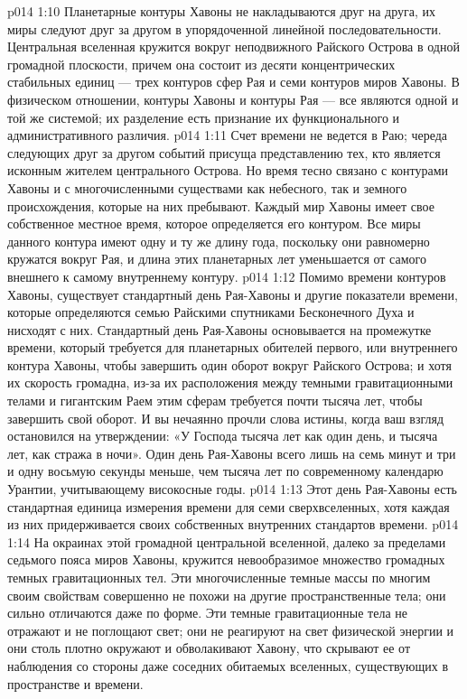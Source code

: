 \vs p014 1:10 Планетарные контуры Хавоны не накладываются друг на друга, их миры следуют друг за другом в упорядоченной линейной последовательности. Центральная вселенная кружится вокруг неподвижного Райского Острова в одной громадной плоскости, причем она состоит из десяти концентрических стабильных единиц --- трех контуров сфер Рая и семи контуров миров Хавоны. В физическом отношении, контуры Хавоны и контуры Рая --- все являются одной и той же системой; их разделение есть признание их функционального и административного различия.
\vs p014 1:11 \pc Счет времени не ведется в Раю; череда следующих друг за другом событий присуща представлению тех, кто является исконным жителем центрального Острова. Но время тесно связано с контурами Хавоны и с многочисленными существами как небесного, так и земного происхождения, которые на них пребывают. Каждый мир Хавоны имеет свое собственное местное время, которое определяется его контуром. Все миры данного контура имеют одну и ту же длину года, поскольку они равномерно кружатся вокруг Рая, и длина этих планетарных лет уменьшается от самого внешнего к самому внутреннему контуру.
\vs p014 1:12 Помимо времени контуров Хавоны, существует стандартный день Рая\hyp{}Хавоны и другие показатели времени, которые определяются семью Райскими спутниками Бесконечного Духа и нисходят с них. Стандартный день Рая\hyp{}Хавоны основывается на промежутке времени, который требуется для планетарных обителей первого, или внутреннего контура Хавоны, чтобы завершить один оборот вокруг Райского Острова; и хотя их скорость громадна, из\hyp{}за их расположения между темными гравитационными телами и гигантским Раем этим сферам требуется почти тысяча лет, чтобы завершить свой оборот. И вы нечаянно прочли слова истины, когда ваш взгляд остановился на утверждении: «У Господа тысяча лет как один день, и тысяча лет, как стража в ночи». Один день Рая\hyp{}Хавоны всего лишь на семь минут и три и одну восьмую секунды меньше, чем тысяча лет по современному календарю Урантии, учитывающему високосные годы.
\vs p014 1:13 Этот день Рая\hyp{}Хавоны есть стандартная единица измерения времени для семи сверхвселенных, хотя каждая из них придерживается своих собственных внутренних стандартов времени.
\vs p014 1:14 \pc На окраинах этой громадной центральной вселенной, далеко за пределами седьмого пояса миров Хавоны, кружится невообразимое множество громадных темных гравитационных тел. Эти многочисленные темные массы по многим своим свойствам совершенно не похожи на другие пространственные тела; они сильно отличаются даже по форме. Эти темные гравитационные тела не отражают и не поглощают свет; они не реагируют на свет физической энергии и они столь плотно окружают и обволакивают Хавону, что скрывают ее от наблюдения со стороны даже соседних обитаемых вселенных, существующих в пространстве и времени.
